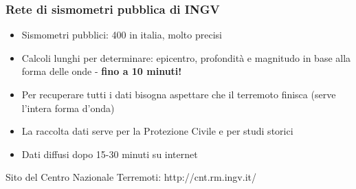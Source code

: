 \begin{frame}
	\frametitle{Rete di sismometri pubblica di INGV}
	
	\begin{itemize}
		\item Sismometri pubblici: 400 in italia, molto precisi
		\item Calcoli lunghi per determinare: epicentro, profondità e magnitudo in base alla forma delle onde - \textbf{fino a 10 minuti!}\
		\item Per recuperare tutti i dati bisogna aspettare che il terremoto finisca (serve l'intera forma d'onda)
		\item La raccolta dati serve per la Protezione Civile e per studi storici
		\item Dati diffusi dopo 15-30 minuti su internet
	\end{itemize}
	
	Sito del Centro Nazionale Terremoti: http://cnt.rm.ingv.it/
	
\end{frame}
